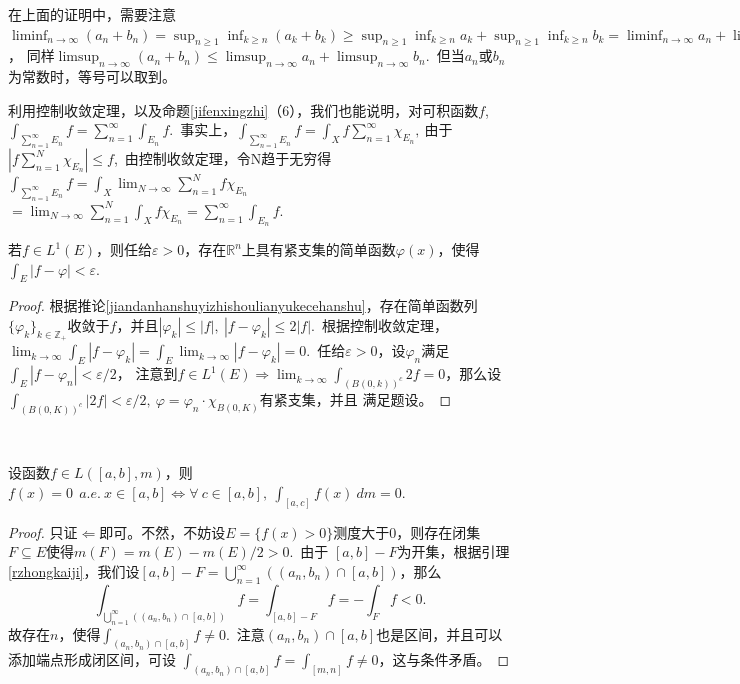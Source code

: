 \documentclass[color=green,thmcnt=section,lang=cn,12pt]{elegantbook}
\numberwithin{equation}{section}%
\numberwithin{figure}{section}%
\newcommand{\RR}{\mathbb{R}}
\renewcommand{\RN}{\RR^n}
\newcommand{\ZZ}{\mathbb{Z}}
\newcommand{\ee}{\varepsilon}
\newcommand{\any}{\forall \ }
\newcommand{\csf}[1]{\{#1_k\}_{k\in \ZZ_+}} %
\newcommand{\cu}[1]{\bigcup_{#1=1}^{\infty}} %
\newcommand{\cs}[1]{\sum_{#1=1}^{\infty}} %
\begin{document}
 在上面的证明中，需要注意$\liminf_{n\to\infty}(a_n+b_n)=\sup_{n\geq 1}\inf_{k\geq n}(a_k+b_k)\geq\sup_{n\geq 1}\inf_{k\geq n}a_k+\sup_{n\geq 1}\inf_{k\geq n}b_k=\liminf_{n\to\infty}a_n+\liminf_{n\to\infty}b_n$，
 同样$\limsup_{n\to\infty}(a_n+b_n)\leq \limsup_{n\to\infty}a_n+\limsup_{n\to\infty}b_n$.\ 
 但当$a_n$或$b_n$为常数时，等号可以取到。


利用控制收敛定理，以及命题\ref{jifenxingzhi}（6），我们也能说明，对可积函数$f$,\ 
$\int_{\cs{n}E_n}f=\cs{n}\int_{E_n}f$.\ 事实上，$\int_{\cs{n}E_n}f=\int_Xf\cs{n}\chi_{E_n},\ $由于$|f\sum_{n=1}^{N}\chi_{E_n}|\leq f$,\ 
由控制收敛定理，令N趋于无穷得$\int_{\cs{n}E_n}f=\int_X\lim_{N\to\infty}\sum_{n=1}^{N}f\chi_{E_n}$
$=\lim_{N\to\infty}\sum_{n=1}^{N}\int_Xf\chi_{E_n}=\cs{n}\int_{E_n}f$.

\begin{corollary}\label{jinzhijijiandanhanshu}
    若$f\in L^1(E)$，则任给$\ee>0$，存在$\RN$上具有紧支集的简单函数$\varphi(x)$，使得$\int_E|f-\varphi|<\ee$.
\end{corollary}
\begin{proof}
根据推论\ref{jiandanhanshuyizhishoulianyukecehanshu}，存在简单函数列$\csf{\varphi}$收敛于$f$，并且$|\varphi_k|\leq |f|,\ |f-\varphi_k|\leq 2|f|$.\ 根据控制收敛定理，
    $\lim_{k\to\infty}\int_E|f-\varphi_k|=\int_E\lim_{k\to\infty}|f-\varphi_k|=0$.\  任给$\ee>0$，设$\varphi_n$满足$\int_E|f-\varphi_n|<\ee/2$， 
      注意到$f\in L^1(E)\Longrightarrow\lim_{k\to\infty}\int_{(B(0,k))^c}2f=0$，那么设$\int_{(B(0,K))^c}|2f|<\ee/2,\ \varphi=\varphi_n\cdot \chi_{B(0,K)}$有紧支集，并且
      满足题设。
\end{proof}
\ 


\begin{example}
    设函数$f\in L([a,b],m)$，则$f(x)=0\ \ a.e.\ x\in [a,b]\Longleftrightarrow\any c\in[a,b],\ \int_{[a,c]}f(x)\ dm=0$.\ 
\end{example}
\begin{proof}
    只证$\Longleftarrow$即可。不然，不妨设$E=\{f(x)>0\}$测度大于0，则存在闭集$F\subseteq E$使得$m(F)=m(E)-m(E)/2>0$.\ 由于
    $[a,b]-F$为开集，根据引理\ref{rzhongkaiji}，我们设$[a,b]-F=\cu{n}((a_n,b_n)\cap[a,b])$，那么\begin{equation*}
        \int_{\cu{n}((a_n,b_n)\cap[a,b])}f=\int_{[a,b]-F}f=-\int_Ff<0.
    \end{equation*}
    故存在$n$，使得$\int_{(a_n,b_n)\cap[a,b]}f\ne 0$.\ 注意$(a_n,b_n)\cap[a,b]$也是区间，并且可以添加端点形成闭区间，可设
    $\int_{(a_n,b_n)\cap[a,b]}f=\int_{[m,n]}f\ne 0$，这与条件矛盾。
\end{proof}
\ 
\end{document}
